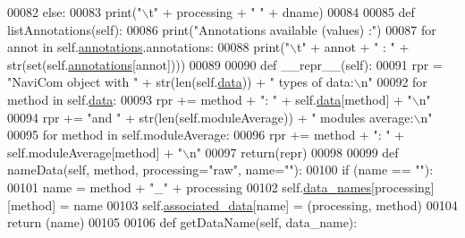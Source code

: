 \begin{DoxyCode}
00082                 \textcolor{keywordflow}{else}:
00083                     \textcolor{keywordflow}{print}(\textcolor{stringliteral}{"\(\backslash\)t"} + processing + \textcolor{stringliteral}{" "} + dname)
00084 
00085     \textcolor{keyword}{def }listAnnotations(self):
00086         \textcolor{keywordflow}{print}(\textcolor{stringliteral}{"Annotations available (values) :"})
00087         \textcolor{keywordflow}{for} annot \textcolor{keywordflow}{in} self.\hyperlink{classnavicom_1_1navicom_1_1NaviCom_a0386d881214943cf3432d0ffe22cbb71}{annotations}.annotations:
00088             \textcolor{keywordflow}{print}(\textcolor{stringliteral}{"\(\backslash\)t"} + annot + \textcolor{stringliteral}{" : "} + str(set(self.\hyperlink{classnavicom_1_1navicom_1_1NaviCom_a0386d881214943cf3432d0ffe22cbb71}{annotations}[annot])))
00089 
00090     \textcolor{keyword}{def }\_\_repr\_\_(self):
00091         rpr = \textcolor{stringliteral}{"NaviCom object with "} + str(len(self.\hyperlink{classnavicom_1_1navicom_1_1NaviCom_aa1abff245573ed8406c6bddb4596f093}{data})) + \textcolor{stringliteral}{" types of data:\(\backslash\)n"}
00092         \textcolor{keywordflow}{for} method \textcolor{keywordflow}{in} self.\hyperlink{classnavicom_1_1navicom_1_1NaviCom_aa1abff245573ed8406c6bddb4596f093}{data}:
00093             rpr += method + \textcolor{stringliteral}{": "} + self.\hyperlink{classnavicom_1_1navicom_1_1NaviCom_aa1abff245573ed8406c6bddb4596f093}{data}[method] + \textcolor{stringliteral}{"\(\backslash\)n"}
00094         rpr += \textcolor{stringliteral}{"and "} + str(len(self.moduleAverage)) + \textcolor{stringliteral}{" modules average:\(\backslash\)n"}
00095         \textcolor{keywordflow}{for} method \textcolor{keywordflow}{in} self.moduleAverage:
00096             rpr += method + \textcolor{stringliteral}{": "} + self.moduleAverage[method] + \textcolor{stringliteral}{"\(\backslash\)n"}
00097         \textcolor{keywordflow}{return}(repr)
00098     
00099     \textcolor{keyword}{def }nameData(self, method, processing="raw", name=""):
00100         \textcolor{keywordflow}{if} (name == \textcolor{stringliteral}{""}):
00101             name = method + \textcolor{stringliteral}{"\_"} + processing
00102         self.\hyperlink{classnavicom_1_1navicom_1_1NaviCom_a68646454fe1481b0065d2f43548319df}{data_names}[processing][method] = name
00103         self.\hyperlink{classnavicom_1_1navicom_1_1NaviCom_a1d7072ae29e32d7ddd1da9cc5def7199}{associated_data}[name] = (processing, method)
00104         \textcolor{keywordflow}{return} (name)
00105 
00106     \textcolor{keyword}{def }getDataName(self, data\_name):

\end{DoxyCode}
